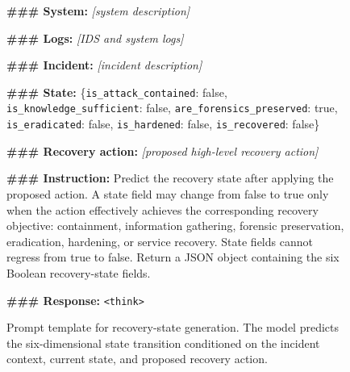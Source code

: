 \documentclass[sigconf]{acmart}
\begin{document}
\begin{figure}[t]
\centering
\begin{tcolorbox}[
  title=Recovery-State Generation Prompt Template,
  colback=bluetwo!10,
  colframe=bluetwo,
  boxrule=0.5pt,
  arc=2pt,
  left=5pt,
  right=5pt,
  top=5pt,
  bottom=5pt]
\footnotesize
\textbf{\#\#\# System:} \emph{[system description]}

\textbf{\#\#\# Logs:} \emph{[IDS and system logs]}

\textbf{\#\#\# Incident:} \emph{[incident description]}

\textbf{\#\#\# State:}
\{\texttt{is\_attack\_contained}: false,
\texttt{is\_knowledge\_sufficient}: false,
\texttt{are\_forensics\_preserved}: true,
\texttt{is\_eradicated}: false,
\texttt{is\_hardened}: false,
\texttt{is\_recovered}: false\}

\textbf{\#\#\# Recovery action:}
\emph{[proposed high-level recovery action]}

\textbf{\#\#\# Instruction:}
Predict the recovery state after applying the proposed action. A state field
may change from false to true only when the action effectively achieves the
corresponding recovery objective: containment, information gathering,
forensic preservation, eradication, hardening, or service recovery. State
fields cannot regress from true to false. Return a JSON object containing the
six Boolean recovery-state fields.

\textbf{\#\#\# Response:}
\texttt{<think>}
\end{tcolorbox}
\caption{Prompt template for recovery-state generation. The model predicts the
six-dimensional state transition conditioned on the incident context, current
state, and proposed recovery action.}
\label{fig:state-prompt}
\end{figure}
\end{document}
